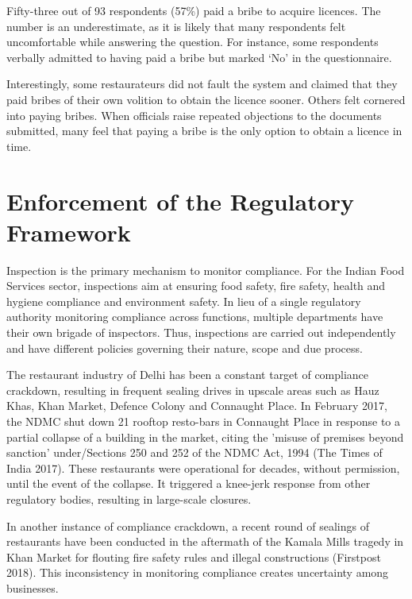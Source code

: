 \documentclass[a4paper, 12pt]{article}
\begin{document}
		Fifty-three out of 93 respondents (57\%) paid a bribe to acquire licences. The number is an underestimate, as it is likely that many respondents felt uncomfortable while answering the question. For instance, some respondents verbally admitted to having 
paid a bribe but marked ‘No’ in the questionnaire.
		
		Interestingly, some restaurateurs did not fault the system and claimed that they paid bribes of their own volition to obtain the licence sooner. Others felt cornered into paying bribes. When officials raise repeated objections to the documents submitted, 
many feel that paying a bribe is the only option to obtain a licence in time.
		
		

	
		\section{Enforcement of the Regulatory Framework}
		\label{sec:2}
		
		Inspection is the primary mechanism to monitor compliance. For the Indian Food Services sector, inspections aim at ensuring food safety, fire safety, health and hygiene compliance and environment safety. In lieu of a single regulatory authority 
monitoring compliance across functions, multiple departments have their own brigade of inspectors. Thus, inspections are carried out independently and have different policies governing their nature, scope and due process.
		
		The restaurant industry of Delhi has been a constant target of compliance crackdown, resulting in frequent sealing drives in upscale areas such as Hauz Khas, Khan Market, Defence Colony and Connaught Place. In February 2017, the NDMC shut down 
21 rooftop resto-bars in Connaught Place in response to a partial collapse of a building in the market, citing the 'misuse of premises beyond sanction' under/Sections 250 and 252 of the NDMC Act, 1994 (The Times of India 2017). These restaurants were 
operational for decades, without permission, until the event of the collapse. It triggered a knee-jerk response from other regulatory bodies, resulting in large-scale closures.
		
		In another instance of compliance crackdown, a recent round of sealings of restaurants have been conducted in the aftermath of the Kamala Mills tragedy in Khan Market for flouting fire safety rules and illegal constructions (Firstpost 2018). This 
inconsistency in monitoring compliance creates uncertainty among businesses.
		
\end{document}
